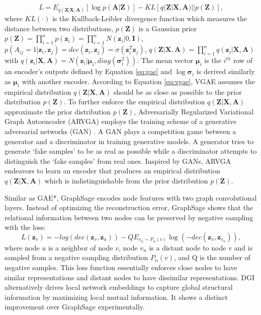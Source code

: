 	\begin{equation}
	    \label{eq:vgae}
	    L = E_{q(\mathbf{Z}|\mathbf{X},\mathbf{A})}[\log p(\mathbf{A}|\mathbf{Z})]-KL[q(\mathbf{Z}|\mathbf{X},\mathbf{A})||p(\mathbf{Z})],
	\end{equation}
	where $KL(\cdot)$ is the Kullback-Leibler divergence function which measures the distance between two distributions, $p(\mathbf{Z})$ is a Gaussian prior $p(\mathbf{Z})=\prod_{i=1}^np(\mathbf{z}_i)=\prod_{i=1}^nN(\mathbf{z}_i|0,\mathbf{I})$,  $p(A_{ij}=1|\mathbf{z}_i,\mathbf{z}_j)=dec(\mathbf{z}_i,\mathbf{z}_j)=\sigma(\mathbf{z}_i^T\mathbf{z}_j)$, $q(\mathbf{Z}|\mathbf{X},\mathbf{A})=\prod_{i=1}^nq(\mathbf{z}_i|\mathbf{X},\mathbf{A})$  with $q(\mathbf{z}_i|\mathbf{X},\mathbf{A})=N(\mathbf{z}_i|\mathbf{\mu}_i,diag(\mathbf{\sigma}_i^2))$. The mean vector $\mathbf{\mu}_i$ is the $i^{th}$ row of an encoder's outputs defined by Equation \ref{eq:gae} and $\log \mathbf{\sigma}_i$ is derived similarly as $\mathbf{\mu}_i$ with another encoder. According to Equation \ref{eq:vgae}, VGAE assumes the empirical distribution $q(\mathbf{Z}|\mathbf{X},\mathbf{A})$ should be as close as possible to the prior distribution $p(\mathbf{Z})$.
    To further enforce the empirical distribution $q(\mathbf{Z}|\mathbf{X},\mathbf{A})$ approximate the prior distribution $p(\mathbf{Z})$, Adversarially Regularized Variational Graph Autoencoder (ARVGA)
	\cite{pan2018adversarially,pan2019learning} employs the training scheme of a generative adversarial networks (GAN) \cite{goodfellow2014generative}. A GAN plays a competition game between a generator and a discriminator in training generative models. A generator tries to generate `fake samples' to be as real as possible while a discriminator attempts to distinguish the `fake samples' from real ones. Inspired by GANs, ARVGA endeavors to learn an encoder that produces an empirical distribution $q(\mathbf{Z}|\mathbf{X},\mathbf{A})$ which is indistinguishable from the prior distribution $p(\mathbf{Z})$.
	
	
	Similar as GAE*, GraphSage \cite{hamilton2017inductive} encodes node features with two graph convolutional layers. 
	Instead of optimizing the reconstruction error, GraphSage shows that the relational information between two nodes can be preserved by negative sampling with the loss:
	\begin{equation}
	    L(\mathbf{z}_v) = -log(dec(\mathbf{z}_v,\mathbf{z}_u))-QE_{v_n\sim P_n(v)}\log (-dec(\mathbf{z}_v,\mathbf{z}_{v_n})),
	\end{equation}
	where node $u$ is a neighbor of node $v$, node $v_n$ is a distant node to node $v$ and is sampled from a negative sampling distribution $P_n(v)$, and Q is the number of negative samples. This loss function essentially enforces close nodes to have similar representations and distant nodes to have dissimilar representations. DGI \cite{velivckovic2019deep} alternatively drives local network embeddings to capture global structural information by maximizing local mutual information. It shows a distinct improvement over GraphSage \cite{hamilton2017inductive} experimentally. 
	
